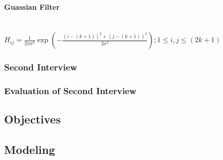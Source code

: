 \begin{flushleft}
            \bk
            \paragraph{Guassian Filter}
            \mbox{} \\
            
            \bk
            \begin{math}
                H_{ij} = \frac{1}{2\pi\sigma^{2}} \exp (-\frac{(i - (k + 1))^{2} + (j - (k + 1))^{2}}{2\sigma^{2}});1\leq i, j \leq(2k+1)
            \end{math}
            \bk
            
            \bk
            \subsubsection{Second Interview}

            \subsubsection{Evaluation of Second Interview}

        \subsection{Objectives}

        \subsection{Modeling}

        \bk

\end{flushleft}